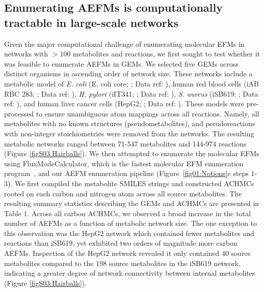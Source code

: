 \documentclass[12pt]{article}
\begin{document}
\subsection*{Enumerating AEFMs is computationally tractable in large-scale networks}

Given the major computational challenge of enumerating molecular EFMs in
networks with $>100$ metabolites and reactions, we first sought to test
whether it was feasible to enumerate AEFMs in GEMs. We selected five GEMs
across distinct organisms in ascending order of network size. These
networks include a metabolic model of \textit{E. coli} (E. coli core;
\citealt{OrthJeffreyD2010RaUo}; Data ref:
\citealt{OrthJeffreyD2010RaUoDATASET}), human red blood cells (iAB RBC
283; \citealt{BordbarAarash2011iApd}; Data ref:
\citealt{BordbarAarash2011iApdDATASET}), \textit{H. pylori} (iIT341;
\citealt{ThieleInes2005EMRo}; Data ref:
\citealt{ThieleInes2005EMRoDATASET}), \textit{S. aureus} (iSB619;
\citealt{BeckerScottA2005Grot}; Data ref:
\citealt{BeckerScottA2005GrotDATASET}), and human liver cancer cells
(HepG2; \citealt{NilssonAvlant2020Qaoa}; Data ref:
\citealt{NilssonAvlant2020QaoaDATASET}). These models were pre-processed
to ensure unambiguous atom mappings across all reactions. Namely, all
metabolites with no known structures (pseudometabolites), and
pseudoreactions with non-integer stoichiometries were removed from the
networks. The resulting metabolic networks ranged between 71-547
metabolites and 144-974 reactions (Figure \ref{figS03:Hairballs}). We then
attempted to enumerate the molecular EFMs using FluxModeCalculator, which
is the fastest molecular EFM enumeration
program~\citep{vanKlinkenJanBert2016Faet}, and our AEFM enumeration
pipeline (Figure~\ref{fig01:Notions}c steps 1-3). We first compiled the
metabolite SMILES strings and constructed ACHMCs rooted on each carbon and
nitrogen atom across all source metabolites. The resulting summary
statistics describing the GEMs and ACHMCs are presented in Table 1. Across
all carbon ACHMCs, we observed a broad increase in the total number of
AEFMs as a function of metabolic network size. The one exception to this
observation was the HepG2 network which contained fewer metabolites and
reactions than iSB619, yet exhibited two orders of magnitude more carbon
AEFMs. Inspection of the HepG2 network revealed it only contained 40
source metabolites compared to the 198 source metabolites in the iSB619
network, indicating a greater degree of network connectivity between
internal metabolites (Figure \ref{figS03:Hairballs}).
\end{document}
